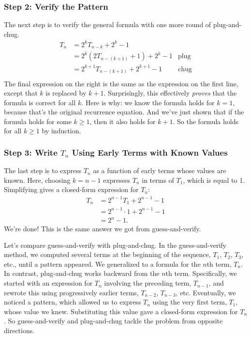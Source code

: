 \subsubsection*{Step 2:  Verify the Pattern}

The next step is to verify the general formula with one more round of plug-and-chug.
\begin{align*}
T_n & = 2^k T_{n-k} + 2^k - 1 \\
  & = 2^k (2 T_{n-(k+1)} + 1) + 2^k - 1 & \text{plug} \\
  & = 2^{k+1} T_{n-(k+1)} + 2^{k+1} - 1 & \text{chug} \\
\end{align*}
The final expression on the right is the same as the expression on the
first line, except that $k$ is replaced by $k+1$.  Surprisingly, this
effectively \emph{proves} that the formula is correct for all $k$.
Here is why: we know the formula holds for $k = 1$, because that's the
original recurrence equation.  And we've just shown that if the
formula holds for some $k \geq 1$, then it also holds for $k + 1$.  So
the formula holds for all $k \geq 1$ by induction.

\subsubsection*{Step 3: Write $T_n$ Using Early Terms with Known Values}

The last step is to express $T_n$ as a function of early terms whose
values are known.  Here, choosing $k = n - 1$ expresses $T_n$ in terms
of $T_1$, which is equal to 1.  Simplifying gives a closed-form
expression for $T_n$:
\begin{align*}
T_n & = 2^{n - 1} T_1 + 2^{n-1} - 1 \\
  & = 2^{n-1} \cdot 1 + 2^{n-1} - 1 \\
  & = 2^n - 1.
\end{align*}
We're done!  This is the same answer we got from guess-and-verify.

\medskip

Let's compare guess-and-verify with plug-and-chug.  In the
guess-and-verify method, we computed several terms at the beginning of
the sequence, $T_1$, $T_2$, $T_3$, etc., until a pattern appeared.  We
generalized to a formula for the $n$th term, $T_n$.  In contrast,
plug-and-chug works backward from the $n$th term.  Specifically, we
started with an expression for $T_n$ involving the preceding term,
$T_{n-1}$, and rewrote this using progressively earlier terms,
$T_{n-2}$, $T_{n-3}$, etc.  Eventually, we noticed a pattern, which
allowed us to express $T_n$ using the very first term, $T_1$, whose
value we knew.  Substituting this value gave a closed-form expression
for $T_n$.  So guess-and-verify and plug-and-chug tackle the problem
from opposite directions.

